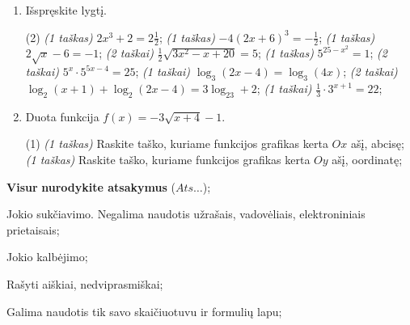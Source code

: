 \documentclass[a4paper]{article}
\begin{document}
\begin{enumerate}
	\item Išspręskite lygtį.
	\begin{tasks}[item-format={\normalfont}, after-item-skip=2mm](2)
		\task \textit{(1 taškas)} $2x^3+2=2\frac{1}{2}$;
		\task \textit{(1 taškas)} $-4(2x+6)^3=-\frac{1}{2}$;
		\task \textit{(1 taškas)} $2\sqrt{x}-6=-1$;
		\task \textit{(2 taškai)} $\frac{1}{2}\sqrt{3x^2-x+20}=5$;
		\task \textit{(1 taškas)} $5^{25-x^2}=1$;
		\task \textit{(2 taškai)} $5^x\cdot5^{5x-4}=25$;
		\task \textit{(1 taškai)} $\log_3(2x-4)=\log_3(4x)$;
		\task \textit{(2 taškai)} $\log _2\left(x+1\right)+\log _2\left(2x-4\right)=3\log _23+2$;
		\task \textit{(1 taškai)} $\frac{1}{3}\cdot 3^{x+1}=22$;
	\end{tasks}
	
	\item Duota funkcija $f(x)=-3\sqrt{x+4}-1$.
	\begin{tasks}[item-format={\normalfont}, after-item-skip=2mm](1)
		\task \textit{(1 taškas)} Raskite taško, kuriame funkcijos grafikas kerta $Ox$ ašį, abcisę;
		\task \textit{(1 taškas)} Raskite taško, kuriame funkcijos grafikas kerta $Oy$ ašį, oordinatę;
	\end{tasks}
\end{enumerate}

\begin{small}
      \begin{enumerate*}[label={(\arabic*)}]
            \item \textbf{Visur} \textbf{nurodykite atsakymus} ($Ats\ldots$);
            \item Jokio sukčiavimo. Negalima naudotis užrašais, vadovėliais,
            elektroniniais prietaisais;
            \item Jokio kalbėjimo;
            \item Rašyti aiškiai, nedviprasmiškai;
            \item Galima naudotis tik savo skaičiuotuvu ir formulių lapu;
      \end{enumerate*}
\end{small}
\end{document}
